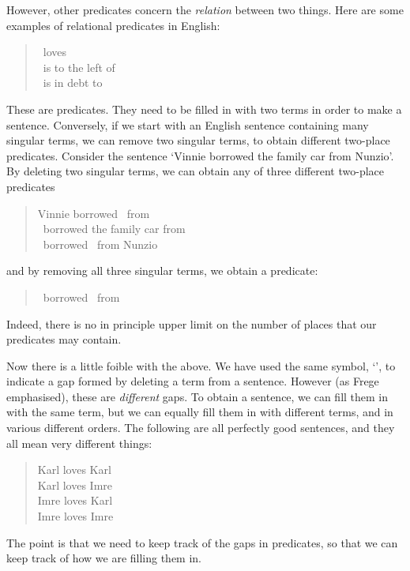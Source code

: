 However, other predicates concern the \emph{relation} between two things. Here are some examples of relational predicates in English:
	\begin{quote}
		\blank\ loves \blank\\
		\blank\ is to the left of \blank\\
		\blank\ is in debt to \blank
	\end{quote}
These are  predicates. They need to be filled in with two terms in order to make a sentence. Conversely, if we start with an English sentence containing many singular terms, we can remove two singular terms, to obtain different two-place predicates. Consider the sentence `Vinnie borrowed the family car from Nunzio'. By deleting two singular terms, we can obtain any of three different two-place predicates
	\begin{quote}
		Vinnie borrowed \blank\ from \blank\\
		\blank\ borrowed the family car from \blank\\
		\blank\ borrowed \blank\ from Nunzio
	\end{quote}
and by removing all three singular terms, we  obtain a  predicate:
	\begin{quote}
		\blank\ borrowed \blank\ from \blank
	\end{quote}
Indeed, there is no in principle upper limit on the number of places that our predicates may contain.

Now there is a little foible with the above. We have used the same symbol, `\blank', to indicate a gap formed by deleting a term from a sentence. However (as Frege emphasised), these are \emph{different} gaps. To obtain a sentence, we can fill them in with the same term, but we can equally fill them in with different terms, and in various different orders. The following are all perfectly good sentences, and they all mean very different things:
	\begin{quote}
		Karl loves Karl\\
		Karl loves Imre\\
		Imre loves Karl\\
		Imre loves Imre
	\end{quote}
The point is that we need to keep track of the gaps in predicates, so that we can keep track of how we are filling them in. 

